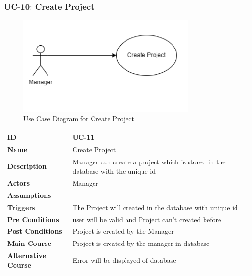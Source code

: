     \subsubsection{UC-10: Create Project}
    \begin{figure}[H]
        \includegraphics[height=5cm, width=0.8\textwidth]{./diagrams/Use Case/u10.png}
        \centering 
        \caption{Use Case Diagram for Create Project}
        \label{fig:Usecase1}
        \end{figure}
        
    \begin{center}
        \begin{tabularx}{\textwidth}{|l|X|}
            \hline
            \textbf{ID} & UC-11 \\
            \hline
            \textbf{Name} & Create Project \\
            \hline
            \textbf{Description} & Manager can create a project which is stored in the database with the unique id \\
            \hline
            \textbf{Actors} & Manager \\
            \hline
            \textbf{Assumptions} &  \\
            \hline
            \textbf{Triggers} & The Project will created in the database with unique id \\
            \hline
            \textbf{Pre Conditions} & user will be valid and Project can't created before  \\
            \hline
            \textbf{Post Conditions} & Project is created by the Manager \\
            \hline
            \textbf{Main Course} & Project is created by the manager in database \\
            \hline
            \textbf{Alternative Course} & Error will be displayed of database  \\
            \hline
            
        \end{tabularx}
    \end{center}
    
